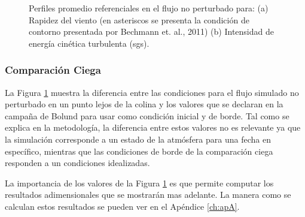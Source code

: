 \begin{figure}[H]
\begin{minipage}{0.5\linewidth}
	\end{minipage}%
	\caption{Perfiles promedio referenciales en el flujo no perturbado para: (a) Rapidez del viento (en asteriscos se presenta la condición de contorno presentada por Bechmann et. al., 2011) (b) Intensidad de energía cinética turbulenta (sgs).}
	\label{fig:06_bol_referencia}
\end{figure}
\subsubsection{Comparación Ciega}
La Figura \ref{fig:06_bol_referencia} muestra la diferencia entre las condiciones para el flujo simulado no perturbado en un punto lejos de la colina y los valores que se declaran en la campaña de Bolund para usar como condición inicial y de borde. Tal como se explica en la metodología, la diferencia entre estos valores no es relevante ya que la simulación corresponde a un estado de la atmósfera para una fecha en específico, mientras que las condiciones de borde de la comparación ciega responden a un condiciones idealizadas. 

La importancia de los valores de la Figura \ref{fig:06_bol_referencia} es que permite computar los resultados adimensionales que se mostrarán mas adelante. La manera como se calculan estos resultados se pueden ver en el Apéndice \ref{ch:apA}.

